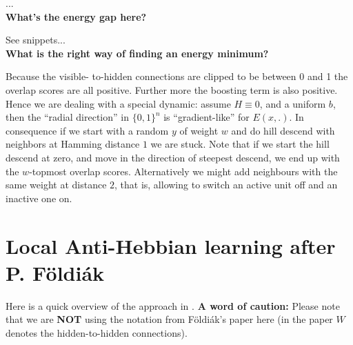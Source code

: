 \documentclass[titlepage]{amsart}
\theoremstyle{definition}
\begin{document}
...
\\

\noindent\textbf{What's the energy gap here?}
\parskip 5pt

See snippets...
\\

\noindent\textbf{What is the right way of finding an energy minimum?}
\parskip 5pt

Because the visible- to-hidden connections are clipped to be between 0 and 1 
the overlap scores are all positive. Further more the boosting term is also positive. 
Hence we are dealing with a special dynamic: assume $H \equiv 0$, and a uniform $b$, 
then the “radial direction” in $\{0,1\}^n$  is “gradient-like” for $E(x,.)$. 
In consequence if we start with a random $y$ of weight $w$ and do hill descend 
with neighbors at Hamming distance $1$ we are stuck. Note that if we start the 
hill descend at zero, and move in the direction of steepest descend, we end up 
with the $w$-topmost overlap scores. Alternatively we might add neighbours with 
the same weight at distance $2$, that is, allowing to switch an active unit off 
and an inactive one on.
% 
% 
\section{Local Anti-Hebbian learning after P. F\"oldi\'ak}
% 
% 
Here is a quick overview of the approach in \cite{foldiak}.
\textbf{A word of caution:} Please note that we are \textbf{NOT} using 
the notation from F\"oldi\'ak's paper here (in the paper $W$ denotes the 
hidden-to-hidden connections).
% 
% 
\end{document}
